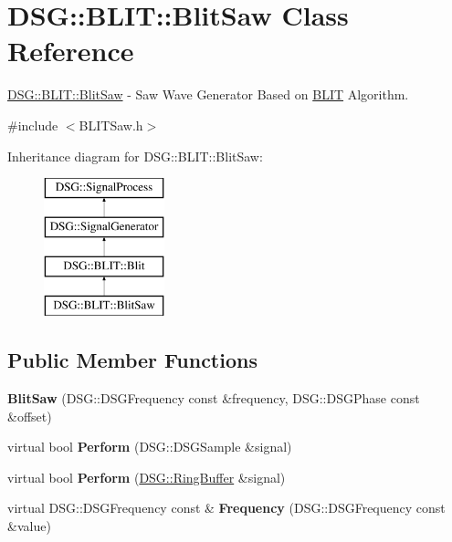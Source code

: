 \hypertarget{class_d_s_g_1_1_b_l_i_t_1_1_blit_saw}{\section{D\+S\+G\+:\+:B\+L\+I\+T\+:\+:Blit\+Saw Class Reference}
\label{class_d_s_g_1_1_b_l_i_t_1_1_blit_saw}
}


\hyperlink{class_d_s_g_1_1_b_l_i_t_1_1_blit_saw}{D\+S\+G\+::\+B\+L\+I\+T\+::\+Blit\+Saw} -\/ Saw Wave Generator Based on \hyperlink{namespace_d_s_g_1_1_b_l_i_t}{B\+L\+I\+T} Algorithm.  




{\ttfamily \#include $<$B\+L\+I\+T\+Saw.\+h$>$}

Inheritance diagram for D\+S\+G\+:\+:B\+L\+I\+T\+:\+:Blit\+Saw\+:\begin{figure}[H]
\begin{center}
\leavevmode
\includegraphics[height=4.000000cm]{class_d_s_g_1_1_b_l_i_t_1_1_blit_saw}
\end{center}
\end{figure}
\subsection*{Public Member Functions}
\begin{DoxyCompactItemize}
\item 
\hypertarget{class_d_s_g_1_1_b_l_i_t_1_1_blit_saw_a3d7e4379c00970fa89085ed2c945a2b7}{{\bfseries Blit\+Saw} (D\+S\+G\+::\+D\+S\+G\+Frequency const \&frequency, D\+S\+G\+::\+D\+S\+G\+Phase const \&offset)}\label{class_d_s_g_1_1_b_l_i_t_1_1_blit_saw_a3d7e4379c00970fa89085ed2c945a2b7}

\item 
\hypertarget{class_d_s_g_1_1_b_l_i_t_1_1_blit_saw_ae24821c51b23b9fe9220a620e558af04}{virtual bool {\bfseries Perform} (D\+S\+G\+::\+D\+S\+G\+Sample \&signal)}\label{class_d_s_g_1_1_b_l_i_t_1_1_blit_saw_ae24821c51b23b9fe9220a620e558af04}

\item 
\hypertarget{class_d_s_g_1_1_b_l_i_t_1_1_blit_saw_ad2edba8ed83558e76afed6ec1d5cf4d6}{virtual bool {\bfseries Perform} (\hyperlink{class_d_s_g_1_1_ring_buffer}{D\+S\+G\+::\+Ring\+Buffer} \&signal)}\label{class_d_s_g_1_1_b_l_i_t_1_1_blit_saw_ad2edba8ed83558e76afed6ec1d5cf4d6}

\item 
\hypertarget{class_d_s_g_1_1_b_l_i_t_1_1_blit_saw_a290d01796efca84b73eb61a3bc419ebb}{virtual D\+S\+G\+::\+D\+S\+G\+Frequency const \& {\bfseries Frequency} (D\+S\+G\+::\+D\+S\+G\+Frequency const \&value)}\label{class_d_s_g_1_1_b_l_i_t_1_1_blit_saw_a290d01796efca84b73eb61a3bc419ebb}

\end{DoxyCompactItemize}
